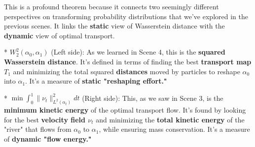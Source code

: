 \documentclass{article}
\begin{document}
This is a profound theorem because it connects two seemingly different perspectives on transforming probability distributions that we've explored in the previous scenes.  It links the \textbf{static} view of Wasserstein distance with the \textbf{dynamic} view of optimal transport.

*   \textbf{\( W_2^2(\alpha_0, \alpha_1) \)} (Left side):  As we learned in Scene 4, this is the \textbf{squared Wasserstein distance}. It's defined in terms of finding the best \textbf{transport map \( T_1 \)} and minimizing the total squared \textbf{distances} moved by particles to reshape \( \alpha_0 \) into \( \alpha_1 \). It's a measure of \textbf{static "reshaping effort."}

*   \textbf{\( \min \int_0^1 \|\nu_t\|_{L^2(\alpha_t)}^2 dt \)} (Right side):  This, as we saw in Scene 3, is the \textbf{minimum kinetic energy} of the optimal transport flow.  It's found by looking for the best \textbf{velocity field \( \nu_t \)} and minimizing the \textbf{total kinetic energy} of the "river" that flows from \( \alpha_0 \) to \( \alpha_1 \), while ensuring mass conservation. It's a measure of \textbf{dynamic "flow energy."}
\end{document}
